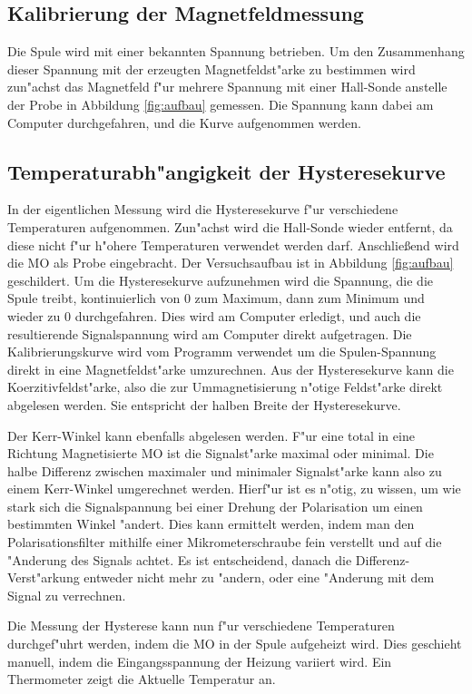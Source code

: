 \subsection{Kalibrierung der Magnetfeldmessung}
Die Spule wird mit einer bekannten Spannung betrieben.
Um den Zusammenhang dieser Spannung mit der erzeugten Magnetfeldst"arke zu bestimmen wird zun"achst das Magnetfeld f"ur mehrere Spannung mit einer Hall-Sonde anstelle der Probe in Abbildung \vref{fig:aufbau} gemessen.
Die Spannung kann dabei am Computer durchgefahren, und die Kurve aufgenommen werden.

\subsection{Temperaturabh"angigkeit der Hysteresekurve}
In der eigentlichen Messung wird die Hysteresekurve f"ur verschiedene Temperaturen aufgenommen.
Zun"achst wird die Hall-Sonde wieder entfernt, da diese nicht f"ur h"ohere Temperaturen verwendet werden darf.
Anschlie{\ss}end wird die MO als Probe eingebracht.
Der Versuchsaufbau ist in Abbildung \ref{fig:aufbau} geschildert.
Um die Hysteresekurve aufzunehmen wird die Spannung, die die Spule treibt, kontinuierlich von 0 zum Maximum, dann zum Minimum und wieder zu 0 durchgefahren.
Dies wird am Computer erledigt, und auch die resultierende Signalspannung wird am Computer direkt aufgetragen.
Die Kalibrierungskurve wird vom Programm verwendet um die Spulen-Spannung direkt in eine Magnetfeldst"arke umzurechnen.
Aus der Hysteresekurve kann die Koerzitivfeldst"arke, also die zur Ummagnetisierung n"otige Feldst"arke direkt abgelesen werden.
Sie entspricht der halben Breite der Hysteresekurve.

Der Kerr-Winkel kann ebenfalls abgelesen werden.
F"ur eine total in eine Richtung Magnetisierte MO ist die Signalst"arke maximal oder minimal.
Die halbe Differenz zwischen maximaler und minimaler Signalst"arke kann also zu einem Kerr-Winkel umgerechnet werden.
Hierf"ur ist es n"otig, zu wissen, um wie stark sich die Signalspannung bei einer Drehung der Polarisation um einen bestimmten Winkel "andert.
Dies kann ermittelt werden, indem man den Polarisationsfilter mithilfe einer Mikrometerschraube fein verstellt und auf die "Anderung des Signals achtet.
Es ist entscheidend, danach die Differenz-Verst"arkung entweder nicht mehr zu "andern, oder eine "Anderung mit dem Signal zu verrechnen.

Die Messung der Hysterese kann nun f"ur verschiedene Temperaturen durchgef"uhrt werden, indem die MO in der Spule aufgeheizt wird.
Dies geschieht manuell, indem die Eingangsspannung der Heizung variiert wird.
Ein Thermometer zeigt die Aktuelle Temperatur an.
